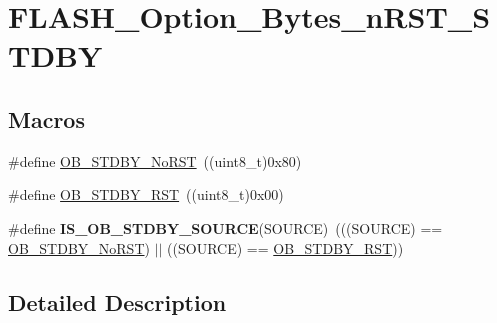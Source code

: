 \hypertarget{group___f_l_a_s_h___option___bytes__n_r_s_t___s_t_d_b_y}{\section{F\-L\-A\-S\-H\-\_\-\-Option\-\_\-\-Bytes\-\_\-n\-R\-S\-T\-\_\-\-S\-T\-D\-B\-Y}
\label{group___f_l_a_s_h___option___bytes__n_r_s_t___s_t_d_b_y}
}
\subsection*{Macros}
\begin{DoxyCompactItemize}
\item 
\#define \hyperlink{group___f_l_a_s_h___option___bytes__n_r_s_t___s_t_d_b_y_ga9588443b20719498422aeb72b65de839}{O\-B\-\_\-\-S\-T\-D\-B\-Y\-\_\-\-No\-R\-S\-T}~((uint8\-\_\-t)0x80)
\item 
\#define \hyperlink{group___f_l_a_s_h___option___bytes__n_r_s_t___s_t_d_b_y_ga69451a6f69247528f58735c9c83499ce}{O\-B\-\_\-\-S\-T\-D\-B\-Y\-\_\-\-R\-S\-T}~((uint8\-\_\-t)0x00)
\item 
\hypertarget{group___f_l_a_s_h___option___bytes__n_r_s_t___s_t_d_b_y_ga8a05393df3a5e89551b4e2e1e8c5b884}{\#define {\bfseries I\-S\-\_\-\-O\-B\-\_\-\-S\-T\-D\-B\-Y\-\_\-\-S\-O\-U\-R\-C\-E}(S\-O\-U\-R\-C\-E)~(((S\-O\-U\-R\-C\-E) == \hyperlink{group___f_l_a_s_h___option___bytes__n_r_s_t___s_t_d_b_y_ga9588443b20719498422aeb72b65de839}{O\-B\-\_\-\-S\-T\-D\-B\-Y\-\_\-\-No\-R\-S\-T}) $|$$|$ ((S\-O\-U\-R\-C\-E) == \hyperlink{group___f_l_a_s_h___option___bytes__n_r_s_t___s_t_d_b_y_ga69451a6f69247528f58735c9c83499ce}{O\-B\-\_\-\-S\-T\-D\-B\-Y\-\_\-\-R\-S\-T}))}\label{group___f_l_a_s_h___option___bytes__n_r_s_t___s_t_d_b_y_ga8a05393df3a5e89551b4e2e1e8c5b884}

\end{DoxyCompactItemize}


\subsection{Detailed Description}


